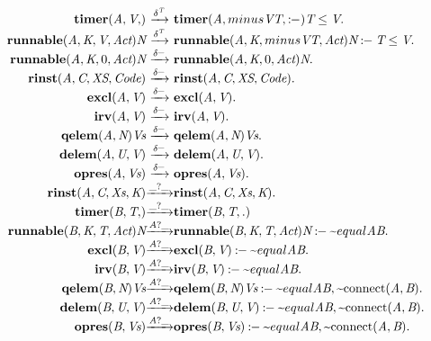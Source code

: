 \[\begin{array}{r@{}c@{}l}
\\\Prule{\Tstep{\Ttimer{\Tvar{A}}{\Tvar{V}}}{\Tdelta{\Tvar{T}}}{\Ttimer{\Tvar{A}}{\Tminus{\Tvar{V}}{\Tvar{T}}}}}{\Tlesseq{\Tvar{T}}{\Tvar{V}}}.
\\\Prule{\Tstep{\Trunnable{\Tvar{A}}{\Tvar{K}}{\Tvar{V}}{\Tvar{Act}}{\Tvar{N}}}{\Tdelta{\Tvar{T}}}{\Trunnable{\Tvar{A}}{\Tvar{K}}{\Tminus{\Tvar{V}}{\Tvar{T}}}{\Tvar{Act}}{\Tvar{N}}}}{\Tlesseq{\Tvar{T}}{\Tvar{V}}}.
\\\Pfact{\Tstep{\Trunnable{\Tvar{A}}{\Tvar{K}}{0}{\Tvar{Act}}{\Tvar{N}}}{\Tdelta{\_}}{\Trunnable{\Tvar{A}}{\Tvar{K}}{0}{\Tvar{Act}}{\Tvar{N}}}}.
\\\Pfact{\Tstep{\Trinst{\Tvar{A}}{\Tvar{C}}{\Tvar{XS}}{\Tvar{Code}}}{\Tdelta{\_}}{\Trinst{\Tvar{A}}{\Tvar{C}}{\Tvar{XS}}{\Tvar{Code}}}}.
\\\Pfact{\Tstep{\Texcl{\Tvar{A}}{\Tvar{V}}}{\Tdelta{\_}}{\Texcl{\Tvar{A}}{\Tvar{V}}}}.
\\\Pfact{\Tstep{\Tirv{\Tvar{A}}{\Tvar{V}}}{\Tdelta{\_}}{\Tirv{\Tvar{A}}{\Tvar{V}}}}.
\\\Pfact{\Tstep{\Tqelem{\Tvar{A}}{\Tvar{N}}{\Tvar{Vs}}}{\Tdelta{\_}}{\Tqelem{\Tvar{A}}{\Tvar{N}}{\Tvar{Vs}}}}.
\\\Pfact{\Tstep{\Tdelem{\Tvar{A}}{\Tvar{U}}{\Tvar{V}}}{\Tdelta{\_}}{\Tdelem{\Tvar{A}}{\Tvar{U}}{\Tvar{V}}}}.
\\\Pfact{\Tstep{\Topres{\Tvar{A}}{\Tvar{Vs}}}{\Tdelta{\_}}{\Topres{\Tvar{A}}{\Tvar{Vs}}}}.
\\\Pfact{\Tstep{\Trinst{\Tvar{A}}{\Tvar{C}}{\Tvar{Xs}}{\Tvar{K}}}{\Thear{\_}{\_}}{\Trinst{\Tvar{A}}{\Tvar{C}}{\Tvar{Xs}}{\Tvar{K}}}}.
\\\Pfact{\Tstep{\Ttimer{\Tvar{B}}{\Tvar{T}}}{\Thear{\_}{\_}}{\Ttimer{\Tvar{B}}{\Tvar{T}}}}.
\\\Prule{\Tstep{\Trunnable{\Tvar{B}}{\Tvar{K}}{\Tvar{T}}{\Tvar{Act}}{\Tvar{N}}}{\Thear{\Tvar{A}}{\_}}{\Trunnable{\Tvar{B}}{\Tvar{K}}{\Tvar{T}}{\Tvar{Act}}{\Tvar{N}}}}{\Pnegate{\Tequal{\Tvar{A}}{\Tvar{B}}}}.
\\\Prule{\Tstep{\Texcl{\Tvar{B}}{\Tvar{V}}}{\Thear{\Tvar{A}}{\_}}{\Texcl{\Tvar{B}}{\Tvar{V}}}}{\Pnegate{\Tequal{\Tvar{A}}{\Tvar{B}}}}.
\\\Prule{\Tstep{\Tirv{\Tvar{B}}{\Tvar{V}}}{\Thear{\Tvar{A}}{\_}}{\Tirv{\Tvar{B}}{\Tvar{V}}}}{\Pnegate{\Tequal{\Tvar{A}}{\Tvar{B}}}}.
\\\Prule{\Tstep{\Tqelem{\Tvar{B}}{\Tvar{N}}{\Tvar{Vs}}}{\Thear{\Tvar{A}}{\_}}{\Tqelem{\Tvar{B}}{\Tvar{N}}{\Tvar{Vs}}}}{\Pnegate{\Tequal{\Tvar{A}}{\Tvar{B}}},\Pnegate{\Tconnect{\Tvar{A}}{\Tvar{B}}}}.
\\\Prule{\Tstep{\Tdelem{\Tvar{B}}{\Tvar{U}}{\Tvar{V}}}{\Thear{\Tvar{A}}{\_}}{\Tdelem{\Tvar{B}}{\Tvar{U}}{\Tvar{V}}}}{\Pnegate{\Tequal{\Tvar{A}}{\Tvar{B}}},\Pnegate{\Tconnect{\Tvar{A}}{\Tvar{B}}}}.
\\\Prule{\Tstep{\Topres{\Tvar{B}}{\Tvar{Vs}}}{\Thear{\Tvar{A}}{\_}}{\Topres{\Tvar{B}}{\Tvar{Vs}}}}{\Pnegate{\Tequal{\Tvar{A}}{\Tvar{B}}},\Pnegate{\Tconnect{\Tvar{A}}{\Tvar{B}}}}.
\\\end{array}
\]

